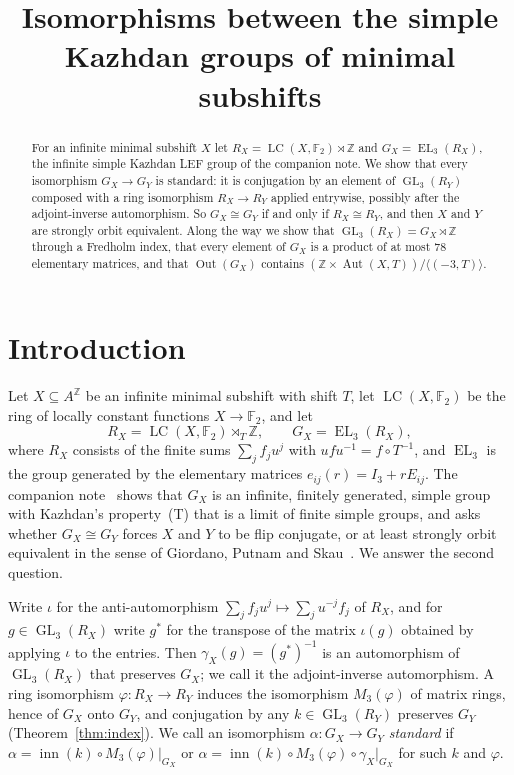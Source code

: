 \documentclass[11pt]{amsart}
\theoremstyle{remark}
\newcommand{\F}{\mathbb F}
\newcommand{\Z}{\mathbb Z}
\newcommand{\LC}{\operatorname{LC}}
\newcommand{\EL}{\operatorname{EL}}
\newcommand{\GL}{\operatorname{GL}}
\newcommand{\inn}{\operatorname{inn}}
\newcommand{\Out}{\operatorname{Out}}
\newcommand{\Aut}{\operatorname{Aut}}
\begin{document}
\title{Isomorphisms between the simple Kazhdan groups of minimal subshifts}
\author{\paperauthorname}
\date{}

\begin{abstract}
For an infinite minimal subshift $X$ let $R_X=\LC(X,\F_2)\rtimes\Z$ and
$G_X=\EL_3(R_X)$, the infinite simple Kazhdan LEF group of the companion
note. We show that every isomorphism $G_X\to G_Y$ is standard: it is
conjugation by an element of $\GL_3(R_Y)$ composed with a ring isomorphism
$R_X\to R_Y$ applied entrywise, possibly after the adjoint-inverse
automorphism. So $G_X\cong G_Y$ if and only if $R_X\cong R_Y$, and then
$X$ and $Y$ are strongly orbit equivalent. Along the way we show that
$\GL_3(R_X)=G_X\rtimes\Z$ through a Fredholm index, that every element of
$G_X$ is a product of at most $78$ elementary matrices, and that
$\Out(G_X)$ contains $(\Z\times\Aut(X,T))/\langle(-3,T)\rangle$.
\end{abstract}
\maketitle

\section{Introduction}\label{sec:intro}

Let $X\subseteq A^{\Z}$ be an infinite minimal subshift with shift $T$, let
$\LC(X,\F_2)$ be the ring of locally constant functions $X\to\F_2$, and let
\[
  R_X=\LC(X,\F_2)\rtimes_T\Z,\qquad G_X=\EL_3(R_X),
\]
where $R_X$ consists of the finite sums $\sum_jf_ju^j$ with
$ufu^{-1}=f\circ T^{-1}$, and $\EL_3$ is the group generated by the
elementary matrices $e_{ij}(r)=I_3+rE_{ij}$. The companion
note~\cite{Note} shows that $G_X$ is an infinite, finitely generated,
simple group with Kazhdan's property~\textup{(T)} that is a limit of finite
simple groups, and asks whether $G_X\cong G_Y$ forces $X$ and $Y$ to be flip
conjugate, or at least strongly orbit equivalent in the sense of Giordano,
Putnam and Skau~\cite{GPS}. We answer the second question.

Write $\iota$ for the anti-automorphism $\sum_jf_ju^j\mapsto\sum_ju^{-j}f_j$
of $R_X$, and for $g\in\GL_3(R_X)$ write $g^*$ for the transpose of the
matrix $\iota(g)$ obtained by applying $\iota$ to the entries. Then
$\gamma_X(g)=(g^*)^{-1}$ is an automorphism of $\GL_3(R_X)$ that preserves
$G_X$; we call it the adjoint-inverse automorphism. A ring isomorphism
$\varphi\colon R_X\to R_Y$ induces the isomorphism $M_3(\varphi)$ of matrix
rings, hence of $G_X$ onto $G_Y$, and conjugation by any $k\in\GL_3(R_Y)$
preserves $G_Y$ (Theorem~\ref{thm:index}). We call an isomorphism
$\alpha\colon G_X\to G_Y$ \emph{standard} if
$\alpha=\inn(k)\circ M_3(\varphi)|_{G_X}$ or
$\alpha=\inn(k)\circ M_3(\varphi)\circ\gamma_X|_{G_X}$ for such $k$ and
$\varphi$.
\end{document}
